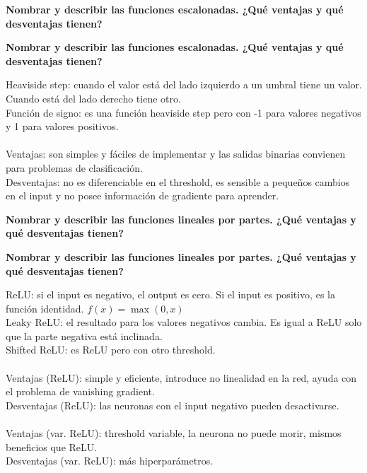 \documentclass[10pt]{memoir}
\begin{document}
    \clearpage
    \begin{center}
        \textbf{\Large Nombrar y describir las funciones escalonadas. ¿Qué ventajas y qué desventajas tienen?}
    \end{center}

    \clearpage
    \begin{center}
        \textbf{\Large Nombrar y describir las funciones escalonadas. ¿Qué ventajas y qué desventajas tienen?} \\
    \end{center}
        Heaviside step: cuando el valor está del lado izquierdo a un umbral tiene un valor. Cuando está del lado derecho tiene otro. \\
        Función de signo: es una función heaviside step pero con -1 para valores negativos y 1 para valores positivos. \\
        \\
        Ventajas: son simples y fáciles de implementar y las salidas binarias convienen para problemas de clasificación. \\
        Desventajas: no es diferenciable en el threshold, es sensible a pequeños cambios en el input y no posee información de gradiente para aprender.

    \clearpage
    \begin{center}
        \textbf{\Large Nombrar y describir las funciones lineales por partes. ¿Qué ventajas y qué desventajas tienen?}
    \end{center}

    \clearpage
    \begin{center}
        \textbf{\Large Nombrar y describir las funciones lineales por partes. ¿Qué ventajas y qué desventajas tienen?} \\
    \end{center}
    ReLU: si el input es negativo, el output es cero. Si el input es positivo, es la función identidad. \(f(x) = \max (0, x)\) \\
    Leaky ReLU: el resultado para los valores negativos cambia. Es igual a ReLU solo que la parte negativa está inclinada. \\
    Shifted ReLU: es ReLU pero con otro threshold. \\
    \\
    Ventajas (ReLU): simple y eficiente, introduce no linealidad en la red, ayuda con el problema de vanishing gradient. \\
    Desventajas (ReLU): las neuronas con el input negativo pueden desactivarse. \\
    \\
    Ventajas (var. ReLU): threshold variable, la neurona no puede morir, mismos beneficios que ReLU. \\
    Desventajas (var. ReLU): más hiperparámetros.
\end{document}
